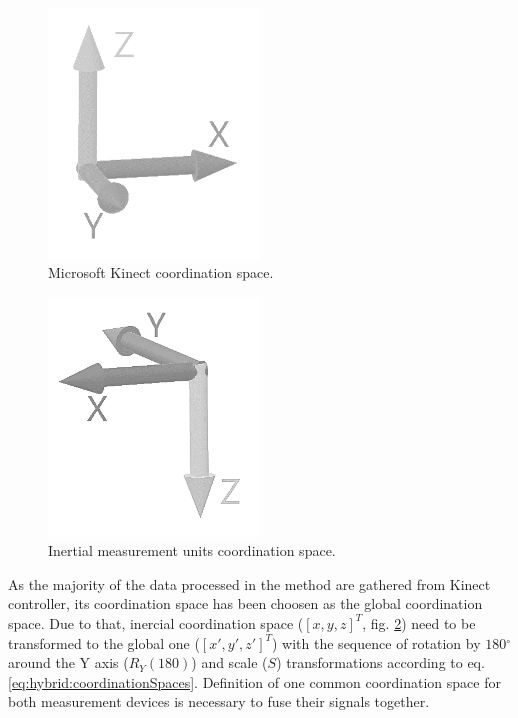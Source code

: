 \documentclass[sensors,article,submit,moreauthors,pdftex,10pt,a4paper]{mdpi}
\newcommand{\degree}{\ensuremath{{}^{\circ}}\xspace}
\begin{document}
\begin{minipage}{\linewidth}
	\centering
	\begin{minipage}[b]{0.45\linewidth}
		\begin{figure}[H] %
			\includegraphics[width=0.5\textwidth]{kinectSpace.png}
			\caption{Microsoft Kinect coordination space.}
			\label{fig:hybrid:coordinationSpaces:kinect}
		\end{figure}
	\end{minipage}
	\hfill
	\begin{minipage}[b]{0.45\linewidth}
		\begin{figure}[H] %
			\includegraphics[width=0.5\textwidth]{ImuSpace.png}
			\caption{Inertial measurement units coordination space.}		
			\label{fig:hybrid:coordinationSpaces:imu}	
		\end{figure}
	\end{minipage}
\end{minipage}
		
As the majority of the data processed in the method are gathered from Kinect controller, its coordination space has been choosen as the global coordination space. Due to that, inercial coordination space ($[x,y,z]^T$, fig. \ref{fig:hybrid:coordinationSpaces:imu}) need to be transformed to the global one ($[x', y', z']^T$) with the sequence of rotation by $180\degree$ around the Y axis ($R_Y(180)$) and scale ($S$) transformations according to eq. \ref{eq:hybrid:coordinationSpaces}. Definition of one common coordination space for both measurement devices is necessary to fuse their signals together.
		
\end{document}
